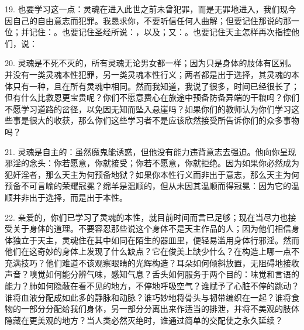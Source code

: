 19. 也要学习这一点：灵魂在进入此世之前未曾犯罪，而是无罪地进入，我们现今因自己的自由意志而犯罪。我恳求你，不要听信任何人曲解；但要记住那说的那一位；并记住：。也要记住圣经所说：，以及；又：。也要记住天主怎样再次指控他们，说：\par

20. 灵魂是不死不灭的，所有灵魂无论男女都一样；因为只是身体的肢体有区别。并没有一类灵魂本性犯罪，另一类灵魂本性行义；两者都是出于选择，其灵魂的本体只有一种，且在所有灵魂中相同。然而我知道，我说了很多，时间已经很长了；但有什么比救恩更宝贵呢？你们不愿意费心在旅途中预备防备异端的干粮吗？你们不愿学习道路的岔径，以免因无知而坠入悬崖吗？如果你们的教师认为你们学习这些事是很大的收获，那么你们这些学习者不是应该欣然接受所告诉你们的众多事物吗？\par

21. 灵魂是自主的：虽然魔鬼能诱惑，但他没有能力违背意志去强迫。他向你呈现邪淫的念头：你若愿意，你就接受；你若不愿意，你就拒绝。因为如果你必然成为犯奸淫者，那么天主为何预备地狱？如果你本性行义而非出于意志，那么天主为何预备不可言喻的荣耀冠冕？绵羊是温顺的，但从未因其温顺而得冠冕：因为它的温顺并非出于选择，而是出于本性。\par

\par

22. 亲爱的，你们已学习了灵魂的本性，就目前时间而言已足够；现在当尽力也接受关于身体的道理。不要容忍那些说这个身体不是天主作品的人；因为他们相信身体独立于天主，灵魂住在其中如同在陌生的器皿里，便轻易滥用身体行邪淫。然而他们在这奇妙的身体上发现了什么缺点？它在俊美上缺少什么？在构造上哪一点不充满技巧？他们难道不该观察眼睛的光辉构造？耳朵如何倾斜放置，无阻碍地接收声音？嗅觉如何能分辨气味，感知气息？舌头如何服务于两个目的：味觉和言语的能力？肺如何隐蔽在看不见的地方，不停地呼吸空气？谁赋予了心脏不停的跳动？谁将血液分配成如此多的静脉和动脉？谁巧妙地将骨头与韧带编织在一起？谁将食物的一部分分配给我们身体，另一部分分离出来作适当的排泄，并将不美观的肢体隐藏在更美观的地方？当人类必然灭绝时，谁通过简单的交配使之永久延续？\par

